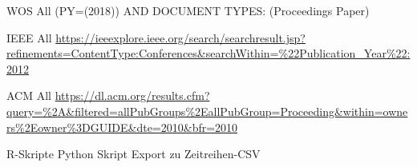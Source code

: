 WOS All
(PY=(2018)) AND DOCUMENT TYPES: (Proceedings Paper)

IEEE All
\url{https://ieeexplore.ieee.org/search/searchresult.jsp?refinements=ContentType:Conferences&searchWithin=%22Publication_Year%22:2012}
	
ACM All
\url{https://dl.acm.org/results.cfm?query=%2A&filtered=allPubGroups%2EallPubGroup=Proceeding&within=owners%2Eowner%3DGUIDE&dte=2010&bfr=2010}

R-Skripte
Python Skript Export zu Zeitreihen-CSV